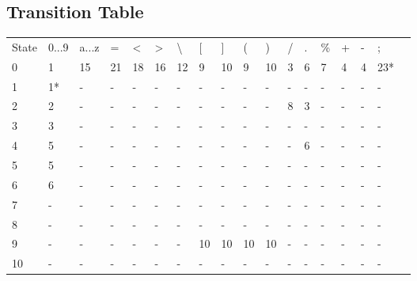\documentclass[12pt]{article}
\begin{document}
{    \subsection {Transition Table}
    \begin{table}[H]
    \begin{tabular}{|l|l|l|l|l|l|l|l|l|l|l|l|l|l|l|l|l|l}
    \cline{1-17}
   State & 0...9 & a...z & =  & \textless{} & \textgreater{} & \textbackslash{} & {[} & {]} & (  & )  & / & . & \% & + & - & ;   &  \\ \cline{1-17}
    0     & 1     & 15    & 21 & 18          & 16             & 12               & 9   & 10  & 9  & 10 & 3 & 6 & 7  & 4 & 4 & 23* &  \\ \cline{1-17}
    1     & 1*    & -     & -  & -           & -              & -                & -   & -   & -  & -  & - & - & -  & - & - & -   &  \\ \cline{1-17}
    2     & 2     & -     & -  & -           & -              & -                & -   & -   & -  & -  & 8 & 3 & -  & - & - & -   &  \\ \cline{1-17}
    3     & 3     & -     & -  & -           & -              & -                & -   & -   & -  & -  & - & - & -  & - & - & -   &  \\ \cline{1-17}
    4     & 5     & -     & -  & -           & -              & -                & -   & -   & -  & -  & - & 6 & -  & - & - & -   &  \\ \cline{1-17}
    5     & 5     & -     & -  & -           & -              & -                & -   & -   & -  & -  & - & - & -  & - & - & -   &  \\ \cline{1-17}
    6     & 6     & -     & -  & -           & -              & -                & -   & -   & -  & -  & - & - & -  & - & - & -   &  \\ \cline{1-17}
    7     & -     & -     & -  & -           & -              & -                & -   & -   & -  & -  & - & - & -  & - & - & -   &  \\ \cline{1-17}
    8     & -     & -     & -  & -           & -              & -                & -   & -   & -  & -  & - & - & -  & - & - & -   &  \\ \cline{1-17}
    9     & -     & -     & -  & -           & -              & -                & 10  & 10  & 10 & 10 & - & - & -  & - & - & -   &  \\ \cline{1-17}
    10    & -     & -     & -  & -           & -              & -                & -   & -   & -  & -  & - & - & -  & - & - & -   &  \\ \cline{1-17}

\end{tabular}
\end{table}}
\end{document}
